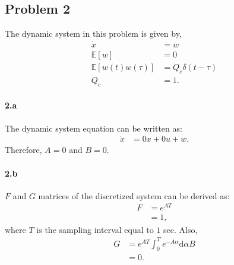 \subsection*{Problem 2}
The dynamic system in this problem is given by,
\begin{align*}
	\dot{x} &= w\\
	\mathbb{E}[w] &= 0\\
	\mathbb{E}[w(t)w(\tau)] &= Q_c\delta(t-\tau)\\
	Q_c &= 1.
\end{align*}
\paragraph{2.a} The dynamic system equation can be written as:
\begin{align*}
	\dot{x} &= 0x + 0u + w.
\end{align*}
Therefore, $A=0$ and $B=0$.
\paragraph{2.b} $F$ and $G$ matrices of the discretized system can be derived as:
\begin{align*}
	F &= e^{AT}\\
	&= 1,
\end{align*}
where $T$ is the sampling interval equal to $1$ sec. Also,
\begin{align*}
	G &= e^{AT}\int_{0}^{T}e^{-A\alpha}\text{d}\alpha B\\
	&= 0.
\end{align*}
